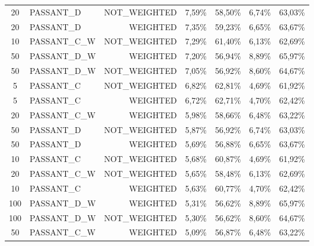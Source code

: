\begin{table}[H]
{\begin{tabular}{ c l r c c c c }
	20 &  PASSANT\_D & NOT\_WEIGHTED &     7,59\% &    58,50\% &     6,74\% &    63,03\% \\
	
	20 &  PASSANT\_D &   WEIGHTED &     7,35\% &    59,23\% &     6,65\% &    63,67\% \\
	
	10 & PASSANT\_C\_W & NOT\_WEIGHTED &     7,29\% &    61,40\% &     6,13\% &    62,69\% \\
	
	50 & PASSANT\_D\_W &   WEIGHTED &     7,20\% &    56,94\% &     8,89\% &    65,97\% \\
	
	50 & PASSANT\_D\_W & NOT\_WEIGHTED &     7,05\% &    56,92\% &     8,60\% &    64,67\% \\
	
	5 &  PASSANT\_C & NOT\_WEIGHTED &     6,82\% &    62,81\% &     4,69\% &    61,92\% \\
	
	5 &  PASSANT\_C &   WEIGHTED &     6,72\% &    62,71\% &     4,70\% &    62,42\% \\
	
	20 & PASSANT\_C\_W &   WEIGHTED &     5,98\% &    58,66\% &     6,48\% &    63,22\% \\
	
	50 &  PASSANT\_D & NOT\_WEIGHTED &     5,87\% &    56,92\% &     6,74\% &    63,03\% \\
	
	50 &  PASSANT\_D &   WEIGHTED &     5,69\% &    56,88\% &     6,65\% &    63,67\% \\
	
	10 &  PASSANT\_C & NOT\_WEIGHTED &     5,68\% &    60,87\% &     4,69\% &    61,92\% \\
	
	20 & PASSANT\_C\_W & NOT\_WEIGHTED &     5,65\% &    58,48\% &     6,13\% &    62,69\% \\
	
	10 &  PASSANT\_C &   WEIGHTED &     5,63\% &    60,77\% &     4,70\% &    62,42\% \\
	
	100 & PASSANT\_D\_W &   WEIGHTED &     5,31\% &    56,62\% &     8,89\% &    65,97\% \\
	
	100 & PASSANT\_D\_W & NOT\_WEIGHTED &     5,30\% &    56,62\% &     8,60\% &    64,67\% \\
	
	50 & PASSANT\_C\_W &   WEIGHTED &     5,09\% &    56,87\% &     6,48\% &    63,22\% \\
	

\end{tabular}}
\end{table}
